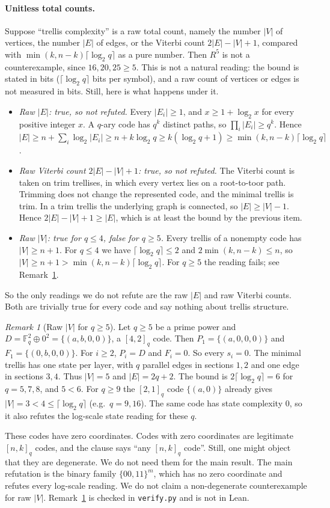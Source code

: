 \documentclass[11pt]{article}
\theoremstyle{definition}
\theoremstyle{remark}
\newtheorem{remark}[theorem]{Remark}
\newcommand{\F}{\mathbb{F}}
\begin{document}
\paragraph{Unitless total counts.} Suppose ``trellis complexity'' is a raw total count, namely
the number $|V|$ of vertices, the number $|E|$ of edges, or the Viterbi count
$2|E|-|V|+1$, compared with $\min(k,n-k)\lceil\log_2q\rceil$ as a pure number. Then
$R^5$ is not a counterexample, since $16,20,25\ge5$. This is not a natural reading: the bound is
stated in bits ($\lceil\log_2q\rceil$ bits per symbol), and a raw count of vertices or edges is
not measured in bits. Still, here is what happens under it.
\begin{itemize}
\item \emph{Raw $|E|$: true, so not refuted.} Every $|E_i|\ge1$, and $x\ge1+\log_2x$ for every
positive integer $x$. A $q$-ary code has $q^k$ distinct paths, so $\prod_i|E_i|\ge q^k$. Hence
$|E|\ge n+\sum_i\log_2|E_i|\ge n+k\log_2q\ge k(\log_2q+1)\ge\min(k,n-k)\lceil\log_2q\rceil$.
\item \emph{Raw Viterbi count $2|E|-|V|+1$: true, so not refuted.} The Viterbi count is taken on
trim trellises, in which every vertex lies on a root-to-toor path. Trimming does not change
the represented code, and the minimal trellis is trim. In a trim trellis the underlying graph
is connected, so $|E|\ge|V|-1$. Hence $2|E|-|V|+1\ge|E|$, which is at least the bound by the
previous item.
\item \emph{Raw $|V|$: true for $q\le4$, false for $q\ge5$.} Every trellis of a nonempty code has
$|V|\ge n+1$. For $q\le4$ we have $\lceil\log_2q\rceil\le2$ and $2\min(k,n-k)\le n$, so
$|V|\ge n+1>\min(k,n-k)\lceil\log_2q\rceil$. For $q\ge5$ the reading fails; see
Remark~\ref{rem:rawV}.
\end{itemize}
So the only readings we do not refute are the raw $|E|$ and raw Viterbi counts. Both are trivially
true for every code and say nothing about trellis structure.

\begin{remark}[Raw $|V|$ for $q\ge5$]\label{rem:rawV}
Let $q\ge5$ be a prime power and $D=\F_q^2\oplus0^2=\{(a,b,0,0)\}$, a $[4,2]_q$ code. Then
$P_1=\{(a,0,0,0)\}$ and $F_1=\{(0,b,0,0)\}$. For $i\ge2$, $P_i=D$ and $F_i=0$. So every $s_i=0$.
The minimal trellis has one state per layer, with $q$ parallel edges in sections $1,2$ and one
edge in sections $3,4$. Thus $|V|=5$ and $|E|=2q+2$. The bound is
$2\lceil\log_2q\rceil=6$ for $q=5,7,8$, and $5<6$. For $q\ge9$ the $[2,1]_q$ code
$\{(a,0)\}$ already gives $|V|=3<4\le\lceil\log_2q\rceil$ (e.g.\ $q=9,16$). The same code has
state complexity $0$, so it also refutes the log-scale state reading for these $q$.

These codes have zero coordinates. Codes with zero coordinates are legitimate $[n,k]_q$ codes,
and the clause says ``any $[n,k]_q$ code''. Still, one might object that they are degenerate.
We do not need them for the main result. The main refutation is the binary family
$\{00,11\}^m$, which has no zero coordinate and refutes every log-scale reading. We do not claim a
non-degenerate counterexample for raw $|V|$. Remark~\ref{rem:rawV} is checked in \texttt{verify.py}
and is not in Lean.
\end{remark}
\end{document}

